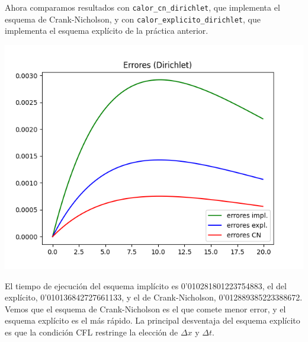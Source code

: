 \documentclass[a4paper, 12pt, oneside]{report}
\begin{document}
Ahora comparamos resultados con \texttt{calor\_cn\_dirichlet}, que implementa el esquema de Crank-Nicholson, y con \texttt{calor\_explicito\_dirichlet}, que implementa el esquema explícito de la práctica anterior.
\begin{center}
    \includegraphics[scale = 0.8]{./images/Figure_3.png}
\end{center}
El tiempo de ejecución del esquema implícito es 0'010281801223754883, el del explícito, 0'010136842727661133, y el de Crank-Nicholson, 0'012889385223388672. Vemos que el esquema de Crank-Nicholson es el que comete menor error, y el esquema explícito es el más rápido. La principal desventaja del esquema explícito es que la condición CFL restringe la elección de $\Delta x$ y $\Delta t$.
\end{document}
